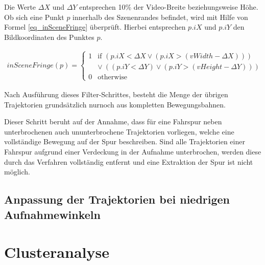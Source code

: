 Die Werte $\Delta X$ und $\Delta Y$ entsprechen 10\% der Video-Breite beziehungsweise Höhe.
Ob sich eine Punkt $p$ innerhalb des Szenenrandes befindet, wird mit Hilfe von Formel \ref{eq_inSceneFringe} überprüft.
Hierbei entsprechen $p.iX$ und $p.iY$ den Bildkoordinaten des Punktes $p$.

\begin{ceqn}
\begin{align}
\label{eq_inSceneFringe}
    inSceneFringe(p) =
    \begin{cases}
        1 & \text{if } (p.iX < \Delta X \lor (p.iX > (vWidth - \Delta X))) \\
          &            \lor\ ((p.iY < \Delta Y) \lor (p.iY > (vHeight - \Delta Y))) \\
        0 & \text{otherwise}
    \end{cases}
\end{align}
\end{ceqn}

Nach Ausführung dieses Filter-Schrittes, besteht die Menge der übrigen Trajektorien grundsätzlich nurnoch
aus kompletten Bewegungsbahnen.

Dieser Schritt beruht auf der Annahme, dass für eine Fahrspur neben unterbrochenen auch
ununterbrochene Trajektorien vorliegen, welche eine vollständige Bewegung auf der Spur beschreiben.
Sind alle Trajektorien einer Fahrspur aufgrund einer Verdeckung in der Aufnahme unterbrochen, werden
diese durch das Verfahren vollständig entfernt und eine Extraktion der Spur ist nicht möglich.

\subsection{Anpassung der Trajektorien bei niedrigen Aufnahmewinkeln}


\section{Clusteranalyse}
\label{sec:realisation_clustering}



